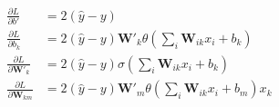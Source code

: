 \documentclass[10pt]{article}
\begin{document}
\begin{align*}\frac{\partial L}{\partial b'} &= 2 (\hat{y} - y) \\
\frac{\partial L}{\partial b_k} &= 2 (\hat{y} - y) \textbf{W}'_k \theta( \sum_i \textbf{W}_{ik} x_i + b_k ) \\ 
\frac{\partial L}{\partial \textbf{W}'_k} &= 2 (\hat{y} - y) \sigma(\sum_i \textbf{W}_{ik} x_i + b_k )\\
\frac{\partial L}{\partial \textbf{W}_{km}} &= 2 (\hat{y} - y) \textbf{W}'_m \theta( \sum_i \textbf{W}_{ik} x_i + b_m ) x_k\end{align*}
\end{document}
